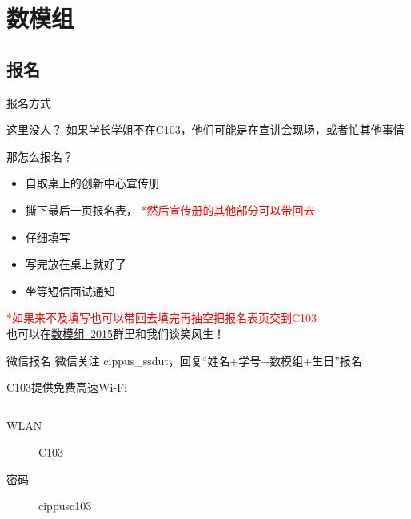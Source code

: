 \documentclass[xcolor={usenames,dvipsnames}]{beamer}
\begin{document}
\section{数模组}
\subsection{报名}
\begin{frame}{报名方式}\label{signin}
	\begin{exampleblock}{这里没人？}
		如果学长学姐不在C103，他们可能是在宣讲会现场，或者忙其他事情
	\end{exampleblock}
	
	\begin{alertblock}{那怎么报名？}
		\begin{itemize}
			\item 自取桌上的创新中心宣传册 \faClone
			\item 撕下最后一页报名表\faTable ， \textcolor{red}{*然后宣传册的其他部分可以带回去}
			\item 仔细填写\faPencil
			\item 写完放在桌上就好了\faPaperclip
			\item 坐等短信面试通知\faPaperPlaneO
		\end{itemize}
		\textcolor{red}{*如果来不及填写也可以带回去填完再抽空把报名表页交到C103} \\
		也可以在\textcolor{blue}{\hyperlink{qun}{\faQq 数模组~2015}}群里和我们谈笑风生！
	\end{alertblock}
	
	\begin{block}{微信报名}
		微信关注\faWechat{ } cippus\_ssdut，回复“姓名+学号+数模组+生日”报名 %
	\end{block}
	
\end{frame}

\begin{frame}{C103提供免费高速Wi-Fi\faWifi}
\begin{columns}
{\LARGE 
    \begin{description}
        \item[WLAN] C103
        \item[密码] cippusc103
    \end{description}
}
\end{columns}
\end{frame}
\end{document}
